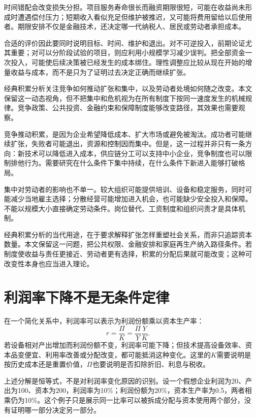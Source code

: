 \documentclass[UTF8,fontset=fandol,zihao=-4,oneside,openany]{ctexbook}
\begin{document}
时间错配会改变损失分担。项目服务寿命很长而融资期限很短，可能在收益尚未形成时遭遇偿付压力；短期收入看似充足但维护被推迟，又可能将费用留给以后使用者。期限安排不仅是金融技术，还决定哪一代纳税人、居民或劳动者承担成本。

合适的评价因此要同时说明目标、时间、维护和退出。对不可逆投入，前期论证尤其重要；对可以分阶段试验的项目，则应利用小规模学习减少误判。把全部资金一次投入，可能使后续决策被已经发生的成本绑住。理性调整应比较从现在开始的增量收益与成本，而不是只为了证明过去决定正确而继续扩张。

经典积累分析关注竞争如何推动扩张和集中，以及劳动者处境如何随之改变。本文保留这一动态视角，但不把集中和危机视为在所有制度下按同一速度发生的机械规律。竞争政策、公共投资、金融约束和保障制度能够改变路径，其效果也需要观察。\cite{Marx1}

\label{arg:P225}
竞争推动积累，是因为企业希望降低成本、扩大市场或避免被淘汰。成功者可能继续扩张，失败者可能退出，资源和控制因而集中。但是，这一过程并非只有一条方向：新技术可以降低进入成本，供应链分工可以支持中小企业，竞争制度也可以限制排他行为。需要研究在什么条件下集中持续，在什么条件下新进入能够打破格局。

集中对劳动者的影响也不单一。较大组织可能提供培训、设备和稳定服务，同时可能减少当地雇主选择；分散经营可能增加进入机会，也可能缺少安全投入和保障。不能以规模大小直接确定劳动条件。岗位替代、工资制度和组织问责才是具体机制。

经典积累分析的当代用途，在于要求解释扩张怎样重塑社会关系，而非只追踪资本数量。本文保留这一问题，把公共权限、金融安排和家庭再生产纳入路径条件。若制度使收益与责任更接近、劳动者更有选择，积累的分配后果就可能改变；这种可改变性本身也应当进入理论。

\section{利润率下降不是无条件定律}
在一个简化关系中，利润率可以表示为利润份额乘以资本生产率：
\[
r=\frac{\Pi}{K}=\frac{\Pi}{Y}\frac{Y}{K}.
\]
若设备相对产出增加而利润份额不变，利润率可能下降；但技术提高设备效率、资本品变便宜、利用率改善或分配改变，都可能抵消这种变化。这里的$K$需要说明是按历史成本还是重置价值，$\Pi$也要说明是否扣除折旧、利息与税收。

\label{arg:P226}
上述分解是恒等式，不是对利润率变化原因的识别。设一个假想企业利润为20、产出为100、资本为200，利润率为10\%；利润份额为20\%，资本生产率为0.5，两者相乘仍为10\%。这个例子只是展示同一比率可以被拆成分配与资本使用两个部分，没有证明哪一部分决定另一部分。
\end{document}
